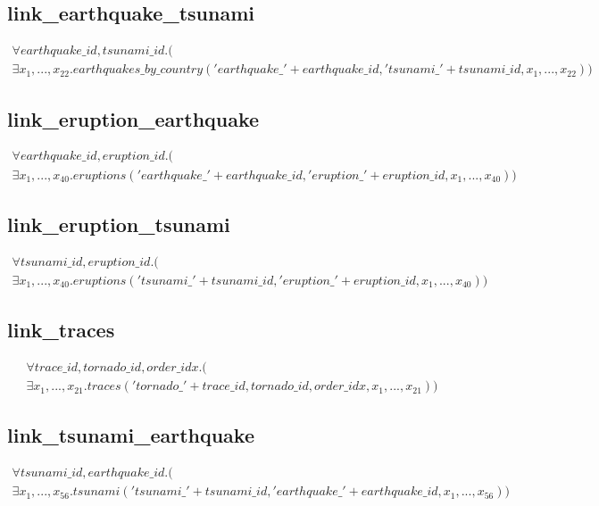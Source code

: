 \documentclass{article}
\begin{document}
\subsection{link\_earthquake\_tsunami}

\begin{multline}
\forall earthquake\_id, tsunami\_id.(\\
\exists x_1, ..., x_{22}. earthquakes\_by\_country('earthquake\_' + earthquake\_id,'tsunami\_' +  tsunami\_id, x_1, ..., x_{22}))
\end{multline} 

\subsection{link\_eruption\_earthquake}

\begin{multline}
\forall earthquake\_id, eruption\_id.(\\
\exists x_1, ..., x_{40}. eruptions('earthquake\_' + earthquake\_id,'eruption\_' +  eruption\_id, x_1, ..., x_{40}))
\end{multline} 

\subsection{link\_eruption\_tsunami}

\begin{multline}
\forall tsunami\_id, eruption\_id.(\\
\exists x_1, ..., x_{40}. eruptions('tsunami\_' + tsunami\_id,'eruption\_' +  eruption\_id, x_1, ..., x_{40}))
\end{multline} 


\subsection{link\_traces}

\begin{multline}
\forall trace\_id, tornado\_id, order\_idx.(\\
\exists x_1, ..., x_{21}. traces('tornado\_' + trace\_id, tornado\_id, order\_idx, x_1, ..., x_{21}))
\end{multline} 

\subsection{link\_tsunami\_earthquake}

\begin{multline}
\forall tsunami\_id, earthquake\_id.(\\
\exists x_1, ..., x_{56}. tsunami('tsunami\_' + tsunami\_id,'earthquake\_' +  earthquake\_id, x_1, ..., x_{56}))
\end{multline} 
\end{document}
